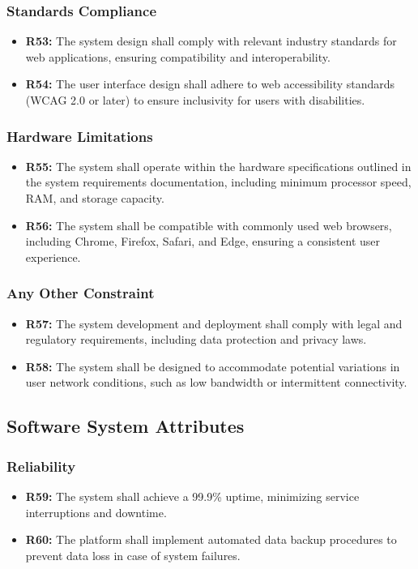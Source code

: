 \documentclass{article}
\begin{document}
\subsubsection{Standards Compliance}
\begin{itemize}
  \item \textbf{R53:} The system design shall comply with relevant industry standards for web applications, ensuring compatibility and interoperability.
  \item \textbf{R54:} The user interface design shall adhere to web accessibility standards (WCAG 2.0 or later) to ensure inclusivity for users with disabilities.
\end{itemize}

\subsubsection{Hardware Limitations}
\begin{itemize}
  \item \textbf{R55:} The system shall operate within the hardware specifications outlined in the system requirements documentation, including minimum processor speed, RAM, and storage capacity.
  \item \textbf{R56:} The system shall be compatible with commonly used web browsers, including Chrome, Firefox, Safari, and Edge, ensuring a consistent user experience.
\end{itemize}

\subsubsection{Any Other Constraint}
\begin{itemize}
  \item \textbf{R57:} The system development and deployment shall comply with legal and regulatory requirements, including data protection and privacy laws.
  \item \textbf{R58:} The system shall be designed to accommodate potential variations in user network conditions, such as low bandwidth or intermittent connectivity.
\end{itemize}

\subsection{Software System Attributes}
\subsubsection{Reliability}
\begin{itemize}
  \item \textbf{R59:} The system shall achieve a 99.9\% uptime, minimizing service interruptions and downtime.
  \item \textbf{R60:} The platform shall implement automated data backup procedures to prevent data loss in case of system failures.
\end{itemize}
\end{document}

